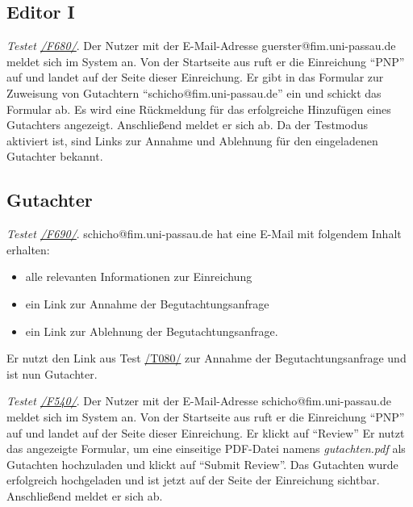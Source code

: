 \subsection{Editor I}
\begin{description}

	 \emph{Testet \hyperref[funkt:680]{/F680/}}.
	Der Nutzer mit der E-Mail-Adresse guerster@fim.uni-passau.de meldet sich im System an.
	Von der Startseite aus ruft er die Einreichung ``P\neq NP'' auf und landet auf der Seite dieser Einreichung.
	Er gibt in das Formular zur Zuweisung von Gutachtern ``schicho@fim.uni-passau.de'' ein und schickt das Formular ab.
	Es wird eine Rückmeldung für das erfolgreiche Hinzufügen eines Gutachters angezeigt.
	Anschließend meldet er sich ab.
	Da der Testmodus aktiviert ist, sind Links zur Annahme und Ablehnung für den eingeladenen Gutachter bekannt.

\end{description}

\subsection{Gutachter}
\begin{description}

	 \emph{Testet \hyperref[funkt:690]{/F690/}}.
	schicho@fim.uni-passau.de hat eine E-Mail mit folgendem Inhalt erhalten:
	\begin{itemize}
		\item alle relevanten Informationen zur Einreichung
		\item ein Link zur Annahme der Begutachtungsanfrage
		\item ein Link zur Ablehnung der Begutachtungsanfrage.
	\end{itemize}
	Er nutzt den Link aus Test \hyperref[t080]{/T080/} zur Annahme der Begutachtungsanfrage und ist nun Gutachter.

	 \emph{Testet \hyperref[funkt:540]{/F540/}}.
	Der Nutzer mit der E-Mail-Adresse schicho@fim.uni-passau.de meldet sich im System an.
	Von der Startseite aus ruft er die Einreichung ``P\neq NP'' auf und landet auf der Seite dieser Einreichung.
	Er klickt auf ``Review''
	Er nutzt das angezeigte Formular, um eine einseitige PDF-Datei namens \emph{gutachten.pdf} als Gutachten hochzuladen und klickt auf ``Submit Review''.
	Das Gutachten wurde erfolgreich hochgeladen und ist jetzt auf der Seite der Einreichung sichtbar.
	Anschließend meldet er sich ab.

\end{description}

